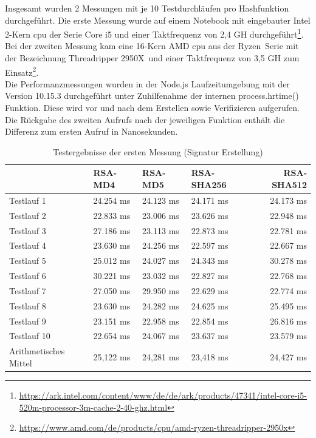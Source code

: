 Insgesamt wurden 2 Messungen mit je 10 Testdurchläufen pro Hashfunktion durchgeführt. Die erste Messung wurde auf einem Notebook mit eingebauter Intel 2-Kern \gls{cpu} der Serie Core i5 und einer Taktfrequenz von 2,4 GH durchgeführt\footnote{\url{https://ark.intel.com/content/www/de/de/ark/products/47341/intel-core-i5-520m-processor-3m-cache-2-40-ghz.html}}. Bei der zweiten Messung kam eine 16-Kern AMD \gls{cpu} aus der \glqq Ryzen\grqq~Serie mit der Bezeichnung \glqq Threadripper 2950X\grqq~und einer Taktfrequenz von 3,5 GH zum Einsatz\footnote{\url{https://www.amd.com/de/products/cpu/amd-ryzen-threadripper-2950x}}.\\
Die Performanzmessungen wurden in der Node.js Laufzeitumgebung mit der Version 10.15.3 durchgeführt unter Zuhilfenahme der internen process.hrtime() Funktion. Diese wird vor und nach dem Erstellen sowie Verifizieren aufgerufen. Die Rückgabe des zweiten Aufrufs nach der jeweiligen Funktion enthält die Differenz zum ersten Aufruf in Nanosekunden.
\begin{table}[h]
	\begin{tabularx}{\textwidth}{p{}|X|X|X|r}
		& RSA-MD4 & RSA-MD5 & RSA-SHA256 & RSA-SHA512\\
		\hline
		Testlauf 1& 24.254 ms& 24.123 ms& 24.171 ms& 24.173 ms\\
		Testlauf 2& 22.833 ms& 23.006 ms& 23.626 ms& 22.948 ms\\
		Testlauf 3& 27.186 ms& 23.113 ms& 22.873 ms& 22.781 ms\\
		Testlauf 4& 23.630 ms& 24.256 ms& 22.597 ms& 22.667 ms\\
		Testlauf 5& 25.012 ms& 24.027 ms& 24.343 ms& 30.278 ms\\
		Testlauf 6& 30.221 ms& 23.032 ms& 22.827 ms& 22.768 ms\\
		Testlauf 7& 27.050 ms& 29.950 ms& 22.629 ms& 22.774 ms\\
		Testlauf 8& 23.630 ms& 24.282 ms& 24.625 ms& 25.495 ms\\
		Testlauf 9& 23.151 ms& 22.958 ms& 22.854 ms& 26.816 ms\\
		Testlauf 10& 22.654 ms& 24.067 ms& 23.637 ms& 23.579 ms\\
		\hline
		Arithmetisches Mittel& 25,122 ms& 24,281 ms& 23,418 ms& 24,427 ms\\
	\end{tabularx}
	\caption{Testergebnisse der ersten Messung (Signatur Erstellung)}
\end{table}
